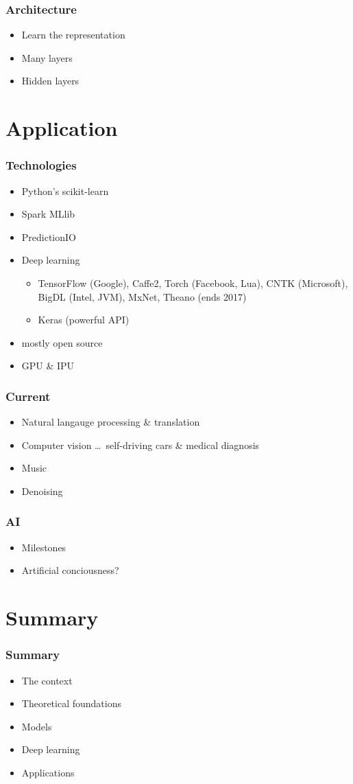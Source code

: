 \documentclass[xcolor={dvipsnames}]{beamer}
\begin{document}
\begin{frame}
  \frametitle{Architecture}
  \begin{itemize}
    \item<+-> Learn the representation
    \item<+-> Many layers
    \item<+-> Hidden layers
  \end{itemize}
\end{frame}

\section{Application}

\begin{frame}
  \frametitle{Technologies}
  \begin{itemize}
    \item<+-> Python's scikit-learn
    \item<+-> Spark MLlib
    \item<+-> PredictionIO
    \item<+-> Deep learning
      \begin{itemize}
        \item TensorFlow (Google), Caffe2, Torch (Facebook, Lua), CNTK (Microsoft), BigDL (Intel, JVM), MxNet, Theano (ends 2017)
        \item Keras (powerful API)
      \end{itemize}
    \item<+-> mostly open source
    \item<+-> GPU \& IPU
  \end{itemize}
\end{frame}

\begin{frame}
  \frametitle{Current}
  \begin{itemize}
    \item<+-> Natural langauge processing \& translation
    \item<+-> Computer vision \ldots\ self-driving cars \& medical diagnosis
    \item<+-> Music
    \item<+-> Denoising
  \end{itemize}
\end{frame}

\begin{frame}
  \frametitle{AI}
  \begin{itemize}
    \item Milestones
    \item Artificial conciousness?
  \end{itemize}
\end{frame}

\section{Summary}

\begin{frame}
  \frametitle{Summary}
  \begin{itemize}
    \item<+-> The context
    \item<+-> Theoretical foundations
    \item<+-> Models
    \item<+-> Deep learning
    \item<+-> Applications
  \end{itemize}
\end{frame}
\end{document}
